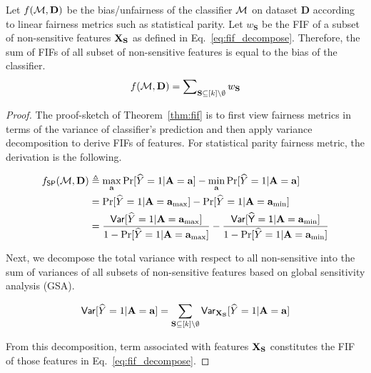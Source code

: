 \documentclass[10pt]{article}
\begin{document}
	\begin{theorem}
		\label{thm:fif}
		Let $ f(\mathcal{M}, \mathbf{D}) $ be the bias/unfairness of the classifier $ \mathcal{M} $ on dataset $ \mathbf{D} $ according to linear fairness metrics such as statistical parity. Let $ w_{\mathbf{S}}  $ be the FIF of a subset of non-sensitive features $ \mathbf{X}_{\mathbf{S}} $ as defined in Eq.~\eqref{eq:fif_decompose}. Therefore, the sum of FIFs of all subset of non-sensitive features is equal to the bias of the classifier. 
		\begin{align}\label{eq:constraint_framework}
			f(\mathcal{M}, \mathbf{D}) = \sum\nolimits_{\mathbf{S} \subseteq [k] \setminus \emptyset} w_{\mathbf{S}}
		\end{align}
	\end{theorem}

	\begin{proof}
	The proof-sketch of Theorem~\ref{thm:fif} is to first view fairness metrics in terms of the variance of classifier's prediction and then apply variance decomposition to derive FIFs of features. For statistical parity fairness metric, the derivation is the following. 
	
	\begin{align*}
		f_{\mathsf{SP}}(\mathcal{M}, \mathbf{D}) &\triangleq \max_{\mathbf{a}}\Pr[\widehat{Y} =1 | \mathbf{A} = \mathbf{a}] - \min_{\mathbf{a}}\Pr[\widehat{Y} =1 | \mathbf{A} = \mathbf{a}] \\ 
		&= \Pr[\widehat{Y} =1 | \mathbf{A} = \mathbf{a}_{\max}] - \Pr[\widehat{Y} =1 | \mathbf{A} = \mathbf{a}_{\min}] \\
		& = \frac{\mathsf{Var}[\widehat{Y} =1 | \mathbf{A} = \mathbf{a}_{\max}]}{1 - \Pr[\widehat{Y} = 1 |  \mathbf{A} = \mathbf{a}_{\max}]} - \frac{\mathsf{\mathsf{Var}[\widehat{Y} =1 | \mathbf{A} = \mathbf{a}_{\min}]}}{1 - \Pr[\widehat{Y} = 1 |  \mathbf{A} = \mathbf{a}_{\min}]}
	\end{align*}

	Next, we decompose the total variance with respect to all non-sensitive  into the sum of variances of  all subsets of non-sensitive features based on global sensitivity analysis (GSA).
	
	\[ \mathsf{Var}[\widehat{Y} =1 | \mathbf{A} = \mathbf{a}] = \sum_{\mathbf{S} \subseteq [k] \setminus \emptyset} \mathsf{Var}_{\mathbf{X}_{\mathbf{S}}}[\widehat{Y} =1 | \mathbf{A}= \mathbf{a}]
	\]
	
	From this decomposition, term associated with features $ \mathbf{X}_{\mathbf{S}} $ constitutes the FIF of those features in Eq.~\eqref{eq:fif_decompose}. 


	\end{proof}
	
\end{document}
